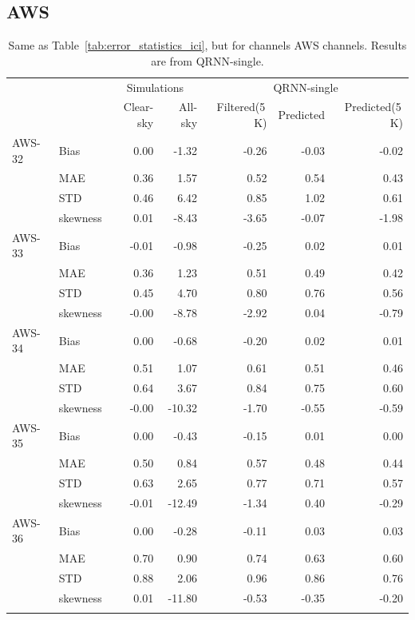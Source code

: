 \documentclass[amt, manuscript]{copernicus}
\begin{document}
\subsection{AWS}
%
\begin{table}[t]
	\caption{Same as Table~\ref{tab:error_statistics_ici}, but for channels AWS channels. Results are from QRNN-single. }
	\label{tab:statistics_qrnn_aws}
	\begin{tabular}{llrr|rrr}
		\tophline
		&&\multicolumn{2}{c|}{Simulations}& \multicolumn{3}{c}{QRNN-single} \\
		\cline{3-7}
		&&   Clear-sky &   All-sky &  Filtered(5\,K) & Predicted & Predicted(5\,K) \\
		\middlehline
		AWS-32  &Bias     & 0.00 & -1.32 & -0.26 & -0.03 & -0.02 \\
				&MAE      & 0.36 &  1.57 &  0.52 &  0.54 &  0.43 \\
				&STD      & 0.46 &  6.42 &  0.85 &  1.02 &  0.61 \\
				&skewness & 0.01 & -8.43 & -3.65 & -0.07 & -1.98 \\
		\middlehline
		AWS-33	&Bias     & -0.01 & -0.98 & -0.25 & 0.02 &  0.01 \\
				&MAE      &  0.36 &  1.23 &  0.51 & 0.49 &  0.42 \\
				&STD      &  0.45 &  4.70 &  0.80 & 0.76 &  0.56 \\
				&skewness & -0.00 & -8.78 & -2.92 & 0.04 & -0.79 \\
		
		\middlehline
		AWS-34	&Bias     &  0.00 &  -0.68 & -0.20 &  0.02 &  0.01 \\
				&MAE      &  0.51 &   1.07 &  0.61 &  0.51 &  0.46 \\
				&STD      &  0.64 &   3.67 &  0.84 &  0.75 &  0.60 \\
				&skewness & -0.00 & -10.32 & -1.70 & -0.55 & -0.59 \\
		\middlehline
		AWS-35	&Bias     &  0.00 &  -0.43 & -0.15 & 0.01 &  0.00 \\
				&MAE      &  0.50 &   0.84 &  0.57 & 0.48 &  0.44 \\
				&STD      &  0.63 &   2.65 &  0.77 & 0.71 &  0.57 \\
				&skewness & -0.01 & -12.49 & -1.34 & 0.40 & -0.29 \\
		\middlehline
		AWS-36  &Bias     & 0.00 &  -0.28 & -0.11 &  0.03 &  0.03 \\
				&MAE      & 0.70 &   0.90 &  0.74 &  0.63 &  0.60 \\
				&STD      & 0.88 &   2.06 &  0.96 &  0.86 &  0.76 \\
				&skewness & 0.01 & -11.80 & -0.53 & -0.35 & -0.20 \\
		\bottomhline				
	\end{tabular}
	\belowtable{} %
\end{table}
\end{document}
